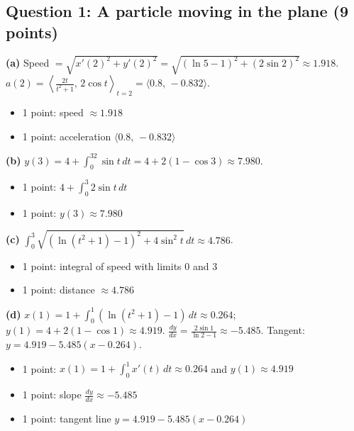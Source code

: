 \documentclass{apcalc}
\begin{document}
\subsection*{Question 1: A particle moving in the plane (9 points)}
\textbf{(a)} Speed $=\sqrt{x'(2)^2+y'(2)^2}=\sqrt{(\ln5-1)^2+(2\sin2)^2}\approx1.918$. $a(2)=\left\langle\frac{2t}{t^2+1},\,2\cos t\right\rangle_{t=2}=\langle0.8,\,-0.832\rangle$.
\begin{itemize}[leftmargin=1.6em,itemsep=0pt]
\item 1 point: speed $\approx1.918$
\item 1 point: acceleration $\langle0.8,\,-0.832\rangle$
\end{itemize}
\textbf{(b)} $y(3)=4+\int_0^32\sin t\,dt=4+2(1-\cos3)\approx7.980$.
\begin{itemize}[leftmargin=1.6em,itemsep=0pt]
\item 1 point: $4+\int_0^3 2\sin t\,dt$
\item 1 point: $y(3)\approx7.980$
\end{itemize}
\textbf{(c)} $\int_0^3\sqrt{(\ln(t^2+1)-1)^2+4\sin^2t}\,dt\approx4.786$.
\begin{itemize}[leftmargin=1.6em,itemsep=0pt]
\item 1 point: integral of speed with limits 0 and 3
\item 1 point: distance $\approx4.786$
\end{itemize}
\textbf{(d)} $x(1)=1+\int_0^1(\ln(t^2+1)-1)\,dt\approx0.264$; $y(1)=4+2(1-\cos1)\approx4.919$. $\frac{dy}{dx}=\frac{2\sin1}{\ln2-1}\approx-5.485$. Tangent: $y=4.919-5.485(x-0.264)$.
\begin{itemize}[leftmargin=1.6em,itemsep=0pt]
\item 1 point: $x(1)=1+\int_0^1x'(t)\,dt\approx0.264$ and $y(1)\approx4.919$
\item 1 point: slope $\frac{dy}{dx}\approx-5.485$
\item 1 point: tangent line $y=4.919-5.485(x-0.264)$
\end{itemize}
\end{document}
